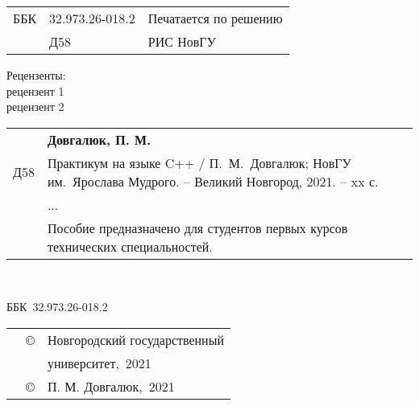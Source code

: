 {%
\parindent=0cm
\thispagestyle{empty}

\begin{tabularx}{\textwidth}{cp{}p{}}
ББК & 32.973.26-018.2 & Печатается по решению \\
 & Д58 &  РИС НовГУ \\
\end{tabularx}

\vspace{1cm}

\begin{center}
Рецензенты: \\
рецензент 1 \\
рецензент 2 \\
\end{center}

\vspace{1cm}


\begin{tabularx}{\textwidth}{cp{}}
& {\bf Довгалюк, П. М.} \\
Д58 & \hspace{3ex} Практикум на языке C++ / П.~М.~Довгалюк;
НовГУ им.~Ярослава Мудрого. -- Великий Новгород, 2021. -- xx с. \vspace{0.32cm} \\
& \hspace{3ex} ...
\\
& \hspace{3ex} Пособие предназначено для студентов первых курсов технических специальностей. \\
\end{tabularx}
\\
\begin{flushright}
ББК~32.973.26-018.2 \\
\end{flushright}

\vfill
\begin{tabularx}{\textwidth}{p{5cm}ll}
& \copyright & Новгородский государственный \\ && университет,~2021 \\ 
& \copyright & П. М. Довгалюк,~2021 \\ 
\end{tabularx}
}

